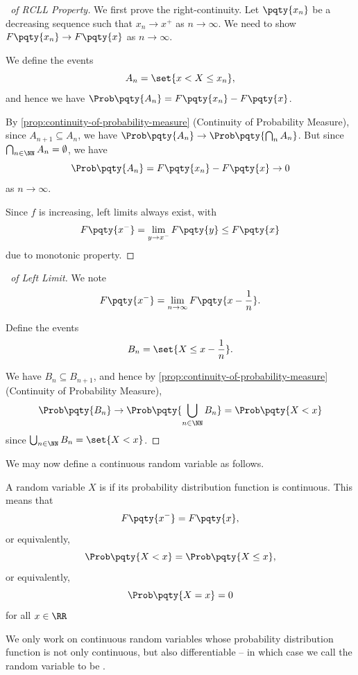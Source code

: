 \begin{proof}[\proofname\ of RCLL Property]
    We first prove the right-continuity. Let \(\pqty{x_n}\) be a decreasing sequence such that \(x_n \to x^+\) as \(n \to \infty\). We need to show \(F\pqty{x_n} \to F\pqty{x}\) as \(n \to \infty\).

    We define the events
    \[
        A_n = \set{x < X \leq x_n},
    \]
    and hence we have \(\Prob\pqty{A_n} = F\pqty{x_n} - F\pqty{x}\).

    By \autoref{prop:continuity-of-probability-measure} (Continuity of Probability Measure), since \(A_{n + 1} \subseteq A_n\), we have \(\Prob\pqty{A_n} \to \Prob\pqty{\bigcap_n A_n}\). But since \(\bigcap_{n \in \NN} A_n = \emptyset\), we have
    \[
        \Prob\pqty{A_n} = F\pqty{x_n} - F\pqty{x} \to 0
    \]
    as \(n \to \infty\).

    Since \(f\) is increasing, left limits always exist, with
    \[
        F\pqty{x^-} = \lim_{y \to x^-} F\pqty{y} \leq F\pqty{x}
    \]
    due to monotonic property.
\end{proof}

\begin{proof}[\proofname\ of Left Limit]
    We note
    \[
        F\pqty{x^-} = \lim_{n \to \infty} F\pqty{x - \frac{1}{n}}.
    \]

    Define the events
    \[
        B_n = \set{X \leq x - \frac{1}{n}}.
    \]

    We have \(B_n \subseteq B_{n + 1}\), and hence by \autoref{prop:continuity-of-probability-measure} (Continuity of Probability Measure),
    \[
        \Prob\pqty{B_n} \to \Prob\pqty{\bigcup_{n \in \NN} B_n} = \Prob\pqty{X < x}
    \]
    since \(\bigcup_{n \in \NN} B_n = \set{X < x}\).
\end{proof}

We may now define a continuous random variable as follows.

\begin{definition}
    \label{def:continuous-random-variable}%
    A random variable \(X\) is  if its probability distribution function is continuous. This means that
    \[
        F\pqty{x^-} = F\pqty{x},
    \]
    or equivalently,
    \[
        \Prob\pqty{X < x} = \Prob\pqty{X \leq x},
    \]
    or equivalently,
    \[
        \Prob\pqty{X = x} = 0
    \]
    for all \(x \in \RR\)
\end{definition}

We only work on continuous random variables whose probability distribution function is not only continuous, but also differentiable -- in which case we call the random variable to be .

